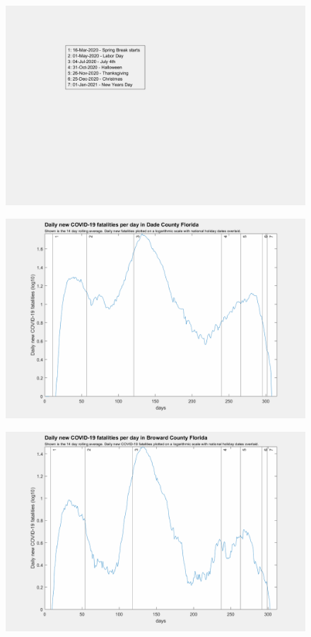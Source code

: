 \documentclass[]{article}
\begin{document}
\begin{figure}[!h]
	\includegraphics[width=\linewidth]{legends/holiday_legend.png}
	\caption{}
	\label{fig:legends/holiday_legendLabel}
\end{figure}

\begin{figure}[!h]
	\includegraphics[width=\linewidth]{images/dade_fatalities_holiday_log.png}
	\caption{}
	\label{fig:images/dade_fatalities_holiday_logLabel}
\end{figure}

\begin{figure}[!h]
	\includegraphics[width=\linewidth]{images/broward_fatalities_holiday_log.png}
	\caption{}
	\label{fig:images/broward_fatalities_holiday_logLabel}
\end{figure}
\end{document}
